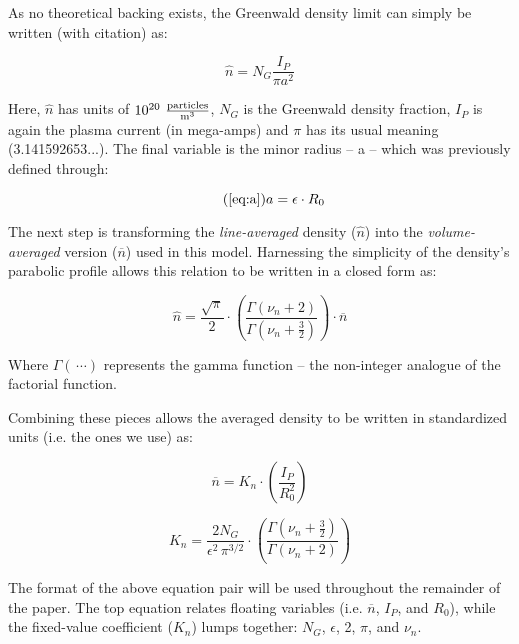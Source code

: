 \documentclass[11pt]{book}
\begin{document}
As no theoretical backing exists, the Greenwald density limit can simply be written (with citation) as:

\begin{equation}
	\hat n = N_G \frac{ I_P }{ \pi a^2}
\end{equation}

Here, $\hat n$ has units of $10^{20} \ \frac{\textnormal{particles}}{\textnormal{m}^3}$, $N_G$ is the Greenwald density fraction, $I_P$ is again the plasma current (in mega-amps) and $\pi$ has its usual meaning (3.141592653...). The final variable is the minor radius -- a -- which was previously defined through:

\begin{equation}
	\tag{\ref{eq:a}}
	a = \epsilon \cdot R_0
\end{equation}

The next step is transforming the \emph{line-averaged} density ($\hat n$) into the \emph{volume-averaged} version ($\overline n$)
 used in this model. Harnessing the simplicity of the density's parabolic profile allows this relation to be written in a closed form as:
 
 \begin{equation}
 	\hat n = \frac{\sqrt{\pi}}{2} \cdot \left( \frac{\Gamma \left( \nu_n + 2 \right)}{\Gamma \left( \nu_n + \frac{3}{2} \right)} \right) \cdot \overline n 
 \end{equation}
 
 Where $\Gamma( \, \cdots)$ represents the gamma function -- the non-integer analogue of the factorial function.
 
 Combining these pieces allows the averaged density to be written in standardized units (i.e. the ones we use) as:
 
 \begin{equation}
 	\label{eq:greenwald}
 	\overline n = K_n \cdot \left( \frac{I_P}{R_0^2} \right)
 \end{equation}
 
 \begin{equation}
 	K_n = \frac{2 N_G}{\epsilon^2 \, \pi^{3/2} } \cdot \left( \frac{\Gamma \left( \nu_n + \frac{3}{2} \right)}{\Gamma \left( \nu_n + 2 \right)} \right)
\end{equation}
 
The format of the above equation pair will be used throughout the remainder of the paper. The top equation relates floating variables (i.e. $\overline n$, $I_P$, and $R_0$), while the fixed-value coefficient ($K_n$) lumps together: $N_G$, $\epsilon$, 2, $\pi$, and $\nu_n$.
\end{document}
